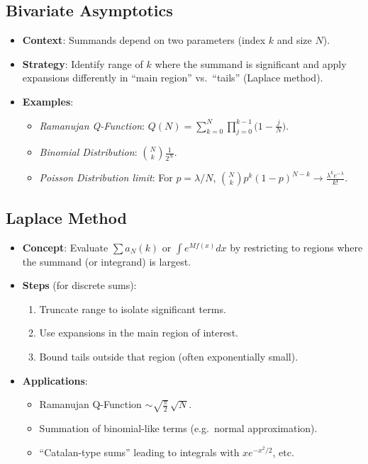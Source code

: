 \documentclass[11pt,letterpaper]{article}
\begin{document}
\subsection{Bivariate Asymptotics}
\begin{itemize}
  \item \textbf{Context}: Summands depend on two parameters (index $k$ and size $N$).
  \item \textbf{Strategy}: Identify range of $k$ where the summand is significant and apply expansions differently in “main region” vs.\ “tails” (Laplace method).
  \item \textbf{Examples}:
    \begin{itemize}
      \item \emph{Ramanujan Q-Function}: $\displaystyle Q(N)=\sum_{k=0}^{N}\prod_{j=0}^{k-1}\bigl(1-\tfrac{j}{N}\bigr).$
      \item \emph{Binomial Distribution}: $\displaystyle \binom{N}{k}\frac{1}{2^N}$.
      \item \emph{Poisson Distribution limit}: For $p=\lambda/N$, $\binom{N}{k}p^k(1-p)^{N-k}\to \frac{\lambda^k e^{-\lambda}}{k!}$.
    \end{itemize}
\end{itemize}

\subsection{Laplace Method}
\begin{itemize}
  \item \textbf{Concept}: Evaluate $\sum a_N(k)$ or $\int e^{M f(x)}dx$ by restricting to regions where the summand (or integrand) is largest.
  \item \textbf{Steps} (for discrete sums):
    \begin{enumerate}
      \item Truncate range to isolate significant terms.
      \item Use expansions in the main region of interest.
      \item Bound tails outside that region (often exponentially small).
    \end{enumerate}
  \item \textbf{Applications}:
    \begin{itemize}
      \item Ramanujan Q-Function $\sim \sqrt{\tfrac{\pi}{2}}\,\sqrt{N}$.
      \item Summation of binomial-like terms (e.g.\ normal approximation).
      \item “Catalan-type sums” leading to integrals with $x e^{-x^2/2}$, etc.
    \end{itemize}
\end{itemize}
\end{document}

